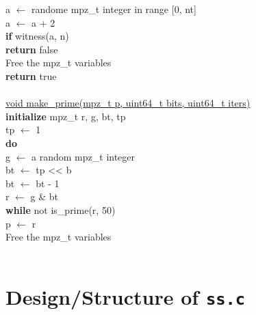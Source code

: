 \documentclass[12pt]{article}
\begin{document}
\indent \indent a $\leftarrow$ randome mpz\_t integer in range [0, nt] \\
\indent \indent a $\leftarrow$ a + 2 \\
\indent \indent \textbf{if} witness(a, n) \\
\indent \indent \indent \textbf{return} false \\
\indent Free the mpz\_t variables \\
\indent \textbf{return} true \\
\\
\underline{void make\_prime(mpz\_t p, uint64\_t bits, uint64\_t iters)} \\
\indent \textbf{initialize} mpz\_t r, g, bt, tp \\
\indent tp $\leftarrow$ 1 \\
\indent \textbf{do} \\
\indent \indent g $\leftarrow$ a random mpz\_t integer \\
\indent \indent bt $\leftarrow$ tp << b \\
\indent \indent bt $\leftarrow$ bt - 1 \\
\indent \indent r $\leftarrow$ g \& bt \\
\indent \textbf{while} not is\_prime(r, 50) \\
\indent p $\leftarrow$ r \\
\indent Free the mpz\_t variables \\
\\
\section{Design/Structure of \texttt{ss.c}}
\end{document}

